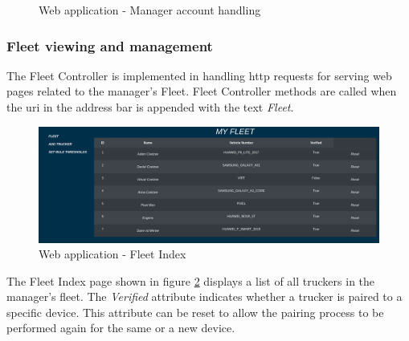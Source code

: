 \begin{figure}[H]
\centering
\caption{Web application - Manager account handling}
\label{fig:webapp_userhandling}
\end{figure}

\subsubsection{Fleet viewing and management}
The Fleet Controller is implemented in handling \Ac{http} requests for serving web pages related to the manager's Fleet.
Fleet Controller methods are called when the \ac{uri} in the address bar is appended with the text \textit{Fleet}.

\begin{figure}[H]
\centering
\includegraphics[width=6in]{webapp_fleet_index.png}
\caption{Web application - Fleet Index}
\label{fig:webapp_fleet_index}
\end{figure}
The Fleet Index page shown in figure \ref{fig:webapp_fleet_index} displays a list of all truckers in the manager's fleet.
The \textit{Verified} attribute indicates whether a trucker is paired to a specific device.
This attribute can be reset to allow the pairing process to be performed again for the same or a new device.

